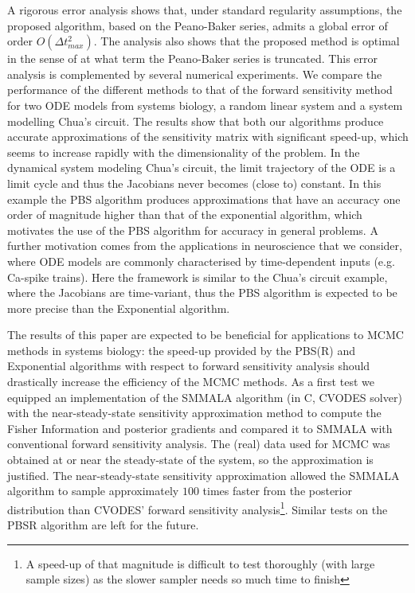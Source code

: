 \documentclass[DIV=12]{scrartcl} %
\theoremstyle{definition}
\begin{document}
A rigorous error analysis shows that, under standard regularity assumptions, the proposed algorithm, based on the Peano-Baker series, admits a global error of order $O(\Delta t_{max} ^2)$. The analysis also shows that the proposed method is optimal in the sense of at what term the Peano-Baker series is truncated. This error analysis is complemented by several numerical experiments. We compare the performance of the different methods to that of the forward sensitivity method for two ODE models from systems biology, a random linear system and a system modelling Chua's circuit. The results show that both our algorithms produce accurate approximations of the sensitivity matrix with significant speed-up, which seems to increase rapidly with the dimensionality of the problem. In the dynamical system modeling Chua's circuit, the limit trajectory of the ODE is a limit cycle and thus the Jacobians never becomes (close to) constant. In this example the PBS algorithm produces approximations that have an accuracy one order of magnitude higher than that of the exponential algorithm, which motivates the use of the PBS algorithm for accuracy in general problems. A further motivation comes from the applications in neuroscience that we consider, where ODE models are commonly characterised by time-dependent inputs (e.g. Ca-spike trains). Here the framework is similar to the Chua's circuit example, where the Jacobians are time-variant, thus the PBS algorithm is expected to be more precise than the Exponential algorithm.

The results of this paper are expected to be beneficial for applications to MCMC methods in systems biology: the speed-up provided by the PBS(R) and Exponential algorithms with respect to forward sensitivity analysis should drastically increase the efficiency of the MCMC methods. As a first test we equipped an implementation of the SMMALA algorithm (in C, CVODES solver) with the near-steady-state sensitivity approximation method to compute the Fisher Information and posterior gradients and compared it to SMMALA with conventional forward sensitivity analysis. The (real) data used for MCMC was obtained at or near the steady-state of the system, so the approximation is justified. The near-steady-state sensitivity approximation allowed the SMMALA algorithm to sample approximately $100$ times faster from the posterior distribution than CVODES' forward sensitivity analysis\footnote{A speed-up of that magnitude is difficult to test thoroughly (with large sample sizes) as the slower sampler needs so much time to finish}. Similar tests on the PBSR algorithm are left for the future.
\end{document}
